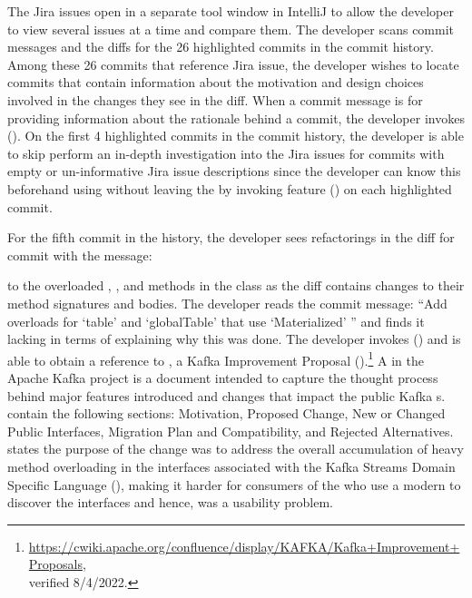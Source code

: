 The Jira issues open  in a separate tool window in IntelliJ to allow the developer to view several issues at a time and compare them.
The developer scans commit messages and the diffs for the 26 highlighted commits in the  commit history.
Among these 26 commits that reference  Jira issue, the developer wishes to locate commits that contain information about the motivation and design choices involved in the changes they see in the diff.
When a commit message is  for providing information about the rationale behind a commit, the developer invokes ().
On the first 4 highlighted commits in the commit history, the developer is able to skip perform an in-depth investigation into the Jira issues for commits with empty or un-informative Jira issue descriptions since the developer can know this beforehand using without leaving the  by invoking feature () on each highlighted commit.

For the fifth commit in the history, the developer sees refactorings in the diff for commit  with the message:

\begin{center}
\end{center}

\noindent to the overloaded , , and  methods in the  class as the diff contains changes to their method signatures and bodies.
The developer reads the commit message: 
``Add overloads for `table' and `globalTable' that use `Materialized' '' 
and finds it lacking in terms of explaining why this was done.
The developer invokes () and is able to obtain a reference to , 
a Kafka Improvement Proposal ().\footnote{\url{https://cwiki.apache.org/confluence/display/KAFKA/Kafka+Improvement+Proposals}, \\verified 8/4/2022.}
A  in the Apache Kafka project is a document intended to capture the thought process behind major features 
introduced and changes that impact the public Kafka s. 
 contain the following sections: Motivation, Proposed Change, New or Changed Public Interfaces, Migration Plan and Compatibility, 
and Rejected Alternatives.
 states the purpose of the change was to address the overall accumulation of heavy method overloading in the 
interfaces associated with the Kafka Streams Domain Specific Language (), 
making it harder for consumers of the  who use a modern  to discover the interfaces and hence,  was a usability problem.

